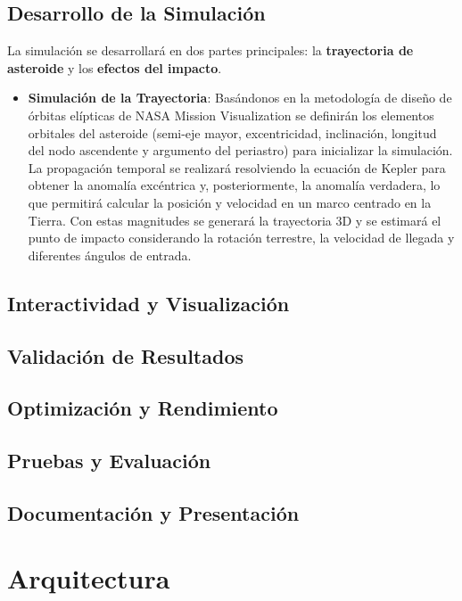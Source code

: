 \documentclass[conference]{IEEEtran}
\begin{document}
\subsection{Desarrollo de la Simulación}
La simulación se desarrollará en dos partes principales: la \textbf{trayectoria
	de asteroide} y los \textbf{efectos del impacto}.
\begin{itemize}
	\item{\textbf{Simulación de la Trayectoria}: Basándonos en la metodología de
	      diseño de órbitas elípticas de NASA Mission Visualization se definirán
	      los elementos orbitales del asteroide (semi-eje mayor, excentricidad,
	      inclinación, longitud del nodo ascendente y argumento del periastro)
	      para inicializar la simulación. La propagación temporal se realizará
	      resolviendo la ecuación de Kepler para obtener la anomalía excéntrica
	      y, posteriormente, la anomalía verdadera, lo que permitirá calcular la
	      posición y velocidad en un marco centrado en la Tierra. Con estas
	      magnitudes se generará la trayectoria 3D y se estimará el punto de
	      impacto considerando la rotación terrestre, la velocidad de llegada y
	      diferentes ángulos de entrada. \cite{nasaEllipticalOrbit}}
\end{itemize}
\subsection{Interactividad y Visualización}

\subsection{Validación de Resultados}

\subsection{Optimización y Rendimiento}

\subsection{Pruebas y Evaluación}

\subsection{Documentación y Presentación}

\section{Arquitectura}
\end{document}
